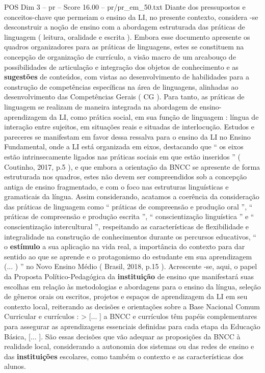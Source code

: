 \begin{textsample}{POS Dim 3 – pr – Score 16.00 – pr/pr\_em\_50.txt}
Diante dos pressupostos e conceitos-chave que permeiam o ensino da LI, no presente contexto, considera -se desconstruir a noção de ensino com a abordagem estruturada das práticas de linguagem ( leitura, oralidade e escrita ).
Embora esse documento apresente os quadros organizadores para as práticas de linguagens, estes se constituem na concepção de organização de currículo, a visão macro de um arcabouço de possibilidades de articulação e integração dos objetos de conhecimento e as \textbf{sugestões} de conteúdos, com vistas ao desenvolvimento de habilidades para a construção de competências específicas na área de linguagens, alinhadas ao desenvolvimento das Competências Gerais ( CG ).
Para tanto, as práticas de linguagem se realizam de maneira integrada na abordagem de ensino-aprendizagem da LI, como prática social, em sua função de linguagem : língua de interação entre sujeitos, em situações reais e situadas de interlocução.
Estudos e pareceres se manifestam em favor dessa ressalva para o ensino da LI no Ensino Fundamental, onde a LI está organizada em eixos, destacando que “ os eixos estão intrinsecamente ligados nas práticas sociais em que estão inseridos ” ( Coutinho, 2017, p.5 ), e que embora a orientação da BNCC se apresente de forma estruturada nos quadros, estes não devem ser compreendidos sob a concepção antiga de ensino fragmentado, e com o foco nas estruturas linguísticas e gramaticais da língua.
Assim considerando, acatamos a coerência da consideração das práticas de linguagem como “ práticas de compreensão e produção oral ”, “ práticas de compreensão e produção escrita ”, “ conscientização linguística ” e “ conscientização intercultural ”, respeitando as características de flexibilidade e integralidade na construção de conhecimentos durante os percursos educativos, “ o \textbf{estímulo} a sua aplicação na vida real, a importância do contexto para dar sentido ao que se aprende e o protagonismo do estudante em sua aprendizagem (... ) ” no Novo Ensino Médio ( Brasil, 2018, p.15 ).
Acrescente -se, aqui, o papel da Proposta Político-Pedagógica da \textbf{instituição} de ensino que manifestará suas escolhas em relação às metodologias e abordagens para o ensino da língua, seleção de gêneros orais ou escritos, projetos e espaços de aprendizagem da LI em seu contexto local, reiterando as decisões e orientações sobre a Base Nacional Comum Curricular e currículos : > [... ] a BNCC e currículos têm papéis complementares para assegurar as aprendizagens essenciais definidas para cada etapa da Educação Básica, [... ].
São essas decisões que vão adequar as proposições da BNCC à realidade local, considerando a autonomia dos sistemas ou das redes de ensino e das \textbf{instituições} escolares, como também o contexto e as características dos alunos.

\end{textsample}
